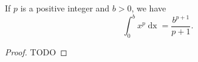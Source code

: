 \documentclass{report}
\begin{document}
\subsection{}%
\label{sub:calculation-integral-int-x-p-p-positive-integer}
\label{sub:theorem-1.15}

\begin{theorem}[1.15]

  If $p$ is a positive integer and $b > 0$, we have
    $$\int_0^b x^p \mathop{dx} = \frac{b^{p+1}}{p+1}.$$

\end{theorem}

\begin{proof}

  TODO

\end{proof}
\end{document}
